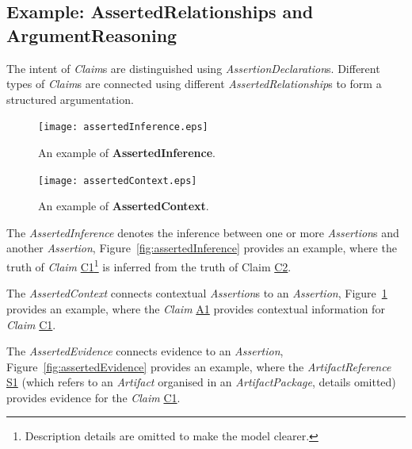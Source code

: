\label{sec:confidence}
\subsection{Example: AssertedRelationships and ArgumentReasoning}
\label{sec:relationships}
The intent of \textit{Claim}s are distinguished using \textit{AssertionDeclaration}s. 
Different types of \textit{Claim}s are connected using different \textit{AssertedRelationship}s to form a structured argumentation. 


\begin{figure}
	\centering
	\begin{minipage}[b]{0.49\textwidth}
		\texttt{[image: assertedInference.eps]}
		\caption{An example of \textbf{AssertedInference}.}
		\label{fig:assertedInference}
	\end{minipage}
	\hfill
	\begin{minipage}[b]{0.49\textwidth}
		\texttt{[image: assertedContext.eps]}
		\caption{An example of \textbf{AssertedContext}.}
		\label{fig:assertedContext}
	\end{minipage}
\end{figure}

The \textit{AssertedInference} denotes the inference between one or more \textit{Assertion}s and another \textit{Assertion}, Figure~\ref{fig:assertedInference} provides an example, where the truth of \textit{Claim} \underline{C1}\footnote{Description details are omitted to make the model clearer.} is inferred from the truth of Claim \underline{C2}. 


The \textit{AssertedContext} connects contextual \textit{Assertion}s to an \textit{Assertion}, Figure~\ref{fig:assertedContext} provides an example, where the \textit{Claim} \underline{A1} provides contextual information for \textit{Claim} \underline{C1}.

The \textit{AssertedEvidence} connects evidence to an \textit{Assertion}, Figure~\ref{fig:assertedEvidence} provides an example, where the \textit{ArtifactReference} \underline{S1} (which refers to an \textit{Artifact} organised in an \textit{ArtifactPackage}, details omitted) provides evidence for the \textit{Claim} \underline{C1}.

